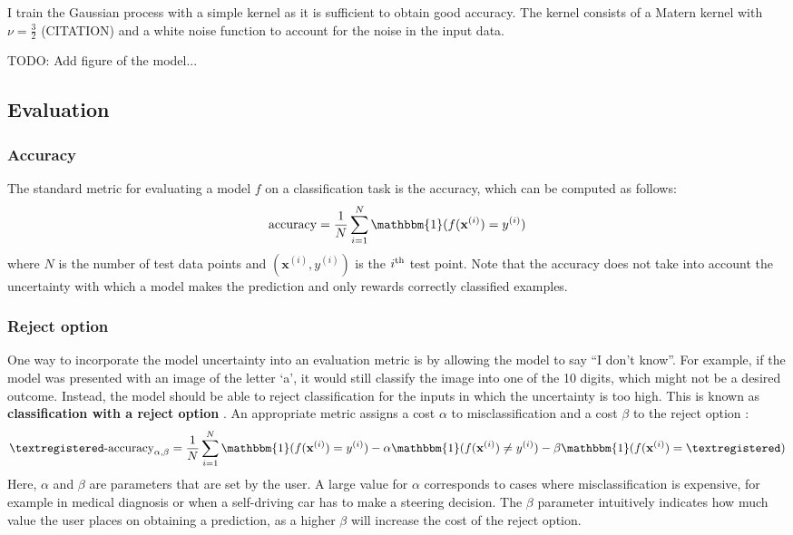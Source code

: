 \documentclass{article}
\begin{document}
I train the Gaussian process with a simple kernel as it is sufficient to obtain good accuracy. The kernel consists of a Matern kernel with $\nu =\frac{3}{2}$ (CITATION) and a white noise function to account for the noise in the input data.

TODO: Add figure of the model...

\subsection{Evaluation}
\subsubsection{Accuracy}
The standard metric for evaluating a model $f$ on a classification task is the accuracy, which can be computed as follows: 
\begin{equation*}
	\textrm{accuracy} = \frac{1}{N} \sum_{i=1}^N \mathbbm{1}(f(\mathbf{x}^{(i)}) = y^{(i)})
\end{equation*}
where $N$ is the number of test data points and $(\mathbf{x}^{(i)}, y^{(i)})$ is the $i\textsuperscript{th}$ test point. Note that the accuracy does not take into account the uncertainty with which a model makes the prediction and only rewards correctly classified examples.

\subsubsection{Reject option}
One way to incorporate the model uncertainty into an evaluation metric is by allowing the model to say ``I don't know''. For example, if the model was presented with an image of the letter `a', it would still classify the image into one of the 10 digits, which might not be a desired outcome. Instead, the model should be able to reject classification for the inputs in which the uncertainty is too high. This is known as \textbf{classification with a reject option} \cite{chow1970optimum}. An appropriate metric assigns a cost $\alpha$ to misclassification and a cost $\beta$ to the reject option \textregistered:
\begin{equation*}
	\textregistered \textrm{-accuracy}_{\alpha, \beta} = \frac{1}{N} \sum_{i=1}^N \mathbbm{1}(f(\mathbf{x}^{(i)}) = y^{(i)}) - \alpha \mathbbm{1}(f(\mathbf{x}^{(i)}) \neq y^{(i)}) - \beta \mathbbm{1}(f(\mathbf{x}^{(i)}) = \textregistered)
\end{equation*}
Here, $\alpha$ and $\beta$ are parameters that are set by the user. A large value for $\alpha$ corresponds to cases where misclassification is expensive, for example in medical diagnosis or when a self-driving car has to make a steering decision. The $\beta$ parameter intuitively indicates how much value the user places on obtaining a prediction, as a higher $\beta$ will increase the cost of the reject option.
\end{document}
